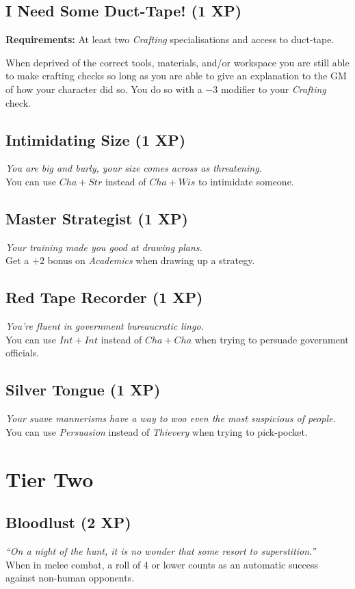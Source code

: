 \subsection{I Need Some Duct-Tape! (1 XP)}
\textbf{Requirements:} At least two \textit{Crafting} specialisations and access to duct-tape.

When deprived of the correct tools, materials, and/or workspace you are still able to make crafting checks so long as you are able to give an explanation to the GM of how your character did so.
You do so with a $-3$ modifier to your \textit{Crafting} check.

\subsection{Intimidating Size (1 XP)}
\textit{You are big and burly, your size comes across as threatening.}\\
You can use $Cha + Str$ instead of $Cha + Wis$ to intimidate someone.

\subsection{Master Strategist (1 XP)}
\textit{Your training made you good at drawing plans.}\\
Get a $+2$ bonus on \textit{Academics} when drawing up a strategy.

\subsection{Red Tape Recorder (1 XP)}
\textit{You're fluent in government bureaucratic lingo.}\\ 
You can use $Int + Int$ instead of $Cha + Cha$ when trying to persuade government officials.

\subsection{Silver Tongue (1 XP)}
\textit{Your suave mannerisms have a way to woo even the most suspicious of people.}\\
You can use \textit{Persuasion} instead of \textit{Thievery} when trying to pick-pocket.

\section{Tier Two}

\subsection{Bloodlust (2 XP)}
\textit{``On a night of the hunt, it is no wonder that some resort to superstition.''}\\
When in melee combat, a roll of 4 or lower counts as an automatic success against non-human opponents.

